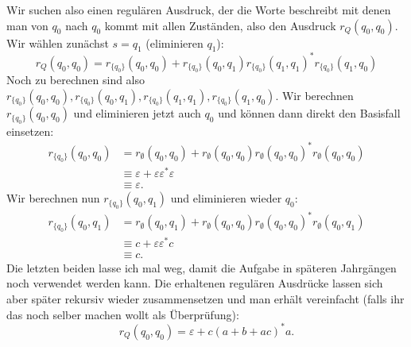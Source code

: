 \documentclass[11pt, a4paper]{article}
\begin{document}
Wir suchen also einen regulären Ausdruck, der die Worte beschreibt mit denen man von \( q_0 \) nach \( q_0 \) kommt mit allen Zuständen, also den Ausdruck \( r_Q(q_0, q_0) \). Wir wählen zunächst \( s = q_1 \) (eliminieren \( q_1 \)):
\[
	r_Q(q_0, q_0) = r_{\{ q_0 \}}(q_0, q_0) + r_{\{ q_0 \}}(q_0, q_1) r_{\{ q_0 \}}(q_1, q_1)^\ast r_{\{ q_0 \}}(q_1, q_0)
\]
Noch zu berechnen sind also \( r_{\{ q_0 \}}(q_0, q_0), r_{\{ q_0 \}}(q_0, q_1), r_{\{ q_0 \}}(q_1, q_1), r_{\{ q_0 \}}(q_1, q_0) \). Wir berechnen \( r_{\{ q_0 \}}(q_0, q_0) \) und eliminieren jetzt auch \( q_0 \) und können dann direkt den Basisfall einsetzen:
\begin{align*}
	r_{\{ q_0 \}}(q_0, q_0) &= r_\emptyset(q_0, q_0) + r_\emptyset(q_0, q_0) r_\emptyset(q_0, q_0)^\ast r_\emptyset(q_0, q_0)\\
	&\equiv \varepsilon + \varepsilon \varepsilon^\ast \varepsilon\\
	&\equiv \varepsilon.
\end{align*}
Wir berechnen nun \( r_{\{ q_0 \}}(q_0, q_1) \) und eliminieren wieder \( q_0 \):
\begin{align*}
	r_{\{ q_0 \}}(q_0, q_1) &= r_\emptyset(q_0, q_1) + r_\emptyset(q_0, q_0) r_\emptyset(q_0, q_0)^\ast r_\emptyset(q_0, q_1)\\
	&\equiv c + \varepsilon \varepsilon^\ast c\\
	&\equiv c.
\end{align*}
Die letzten beiden lasse ich mal weg, damit die Aufgabe in späteren Jahrgängen noch verwendet werden kann. Die erhaltenen regulären Ausdrücke lassen sich aber später rekursiv wieder zusammensetzen und man erhält vereinfacht (falls ihr das noch selber machen wollt als Überprüfung):
\[
	r_Q(q_0, q_0) = \varepsilon + c(a+b+ac)^\ast a.
\]
\end{document}
